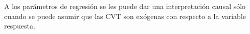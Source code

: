 \documentclass[spanish]{article}
\numberwithin{figure}{subsection}
\numberwithin{equation}{subsection}
\numberwithin{table}{subsection}
\def\xseqn{$X_{i1}, ..., X_{in_i}$}
\begin{document}
A los parámetros de regresión se les puede dar una interpretación causal sólo
cuando se puede asumir que las CVT son exógenas con respecto a la variable
respuesta.






\end{document}
